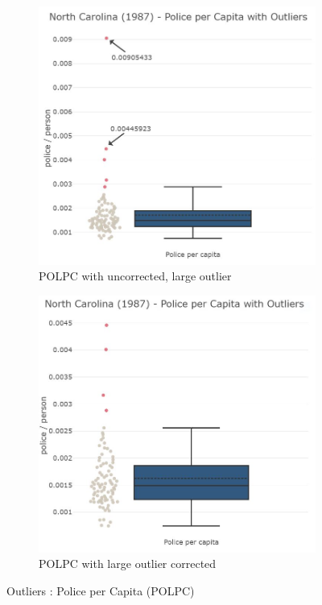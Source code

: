 \vspace*{0.5in}
\begin{figure}[!ht]
	\begin{subfigure}[b]{0.5\textwidth}
		\centering
		\includegraphics[width=\linewidth]{images/EDA_polpc_uncorrected.jpg}
		\caption{POLPC with uncorrected, large outlier}
		\label{fig:EDA POLPC variable uncorrected}
	\end{subfigure}
	\hfill
	\begin{subfigure}[b]{0.5\textwidth}
		\centering
		\includegraphics[width=\linewidth]{images/EDA_polpc_corrected.jpg}
		\caption{POLPC with large outlier corrected}
		\label{fig:EDA POLPC variable corrected}
	\end{subfigure}
	\label{fig:EDA POLPC Outlier Treatment}
	\caption{Outliers : Police per Capita (POLPC)}
\end{figure}

